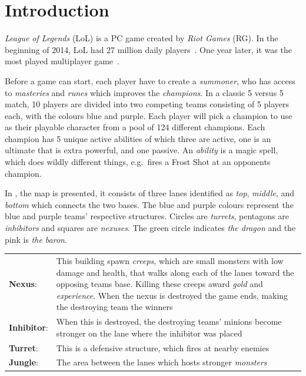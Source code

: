 \section{Introduction}\label{sec:intro}


\emph{League of Legends} (LoL) is a PC game created by \emph{Riot Games} (RG). In the beginning of 2014, LoL had 27 million daily players~\cite{LoL27mill}. One year later, it was the most played multiplayer game~\cite{LoLmostplayed}.

Before a game can start, each player have to create a \emph{summoner}, who has access to \emph{masteries} and \emph{runes} which improves the \emph{champions}. In a classic 5 versus 5 match, 10 players are divided into two competing teams consisting of 5 players each, with the colours blue and purple. Each player will pick a champion to use as their playable character from a pool of 124 different champions. Each champion has 5 unique active abilities of which three are active, one is an ultimate that is extra powerful, and one passive. An \emph{ability} is a magic spell, which does wildly different things, e.g.\ fires a Frost Shot at an opponents champion. 

In , the map is presented, it consists of three lanes identified as \emph{top}, \emph{middle}, and \emph{bottom} which connects the two bases. The blue and purple colours represent the blue and purple teams' respective structures. Circles are \emph{turrets}, pentagons are \emph{inhibitors} and squares are \emph{nexuses}. The green circle indicates \emph{the dragon} and the pink is \emph{the baron}.

\begin{table}[!h]
  \begin{tabular}{l p{13cm}}
    \textbf{Nexus}: & This building spawn \emph{creeps}, which are small monsters with low damage and health, that walks along each of the lanes toward the opposing teams base. Killing these creeps award \emph{gold} and \emph{experience}. When the nexus is destroyed the game ends, making the destroying team the winners\\
    \textbf{Inhibitor}: & When this is destroyed, the destroying teams' minions become stronger on the lane where the inhibitor was placed\\
    \textbf{Turret}: & This is a defensive structure, which fires at nearby enemies\\
    \textbf{Jungle}: & The area between the lanes which hosts stronger \emph{monsters}\\
  \end{tabular}
\end{table}

